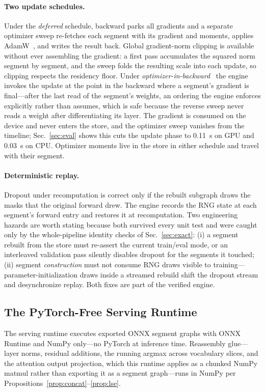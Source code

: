 \documentclass[journal]{IEEEtran}
\begin{document}
\paragraph{Two update schedules.}
Under the \emph{deferred} schedule, backward parks all gradients and a
separate optimizer sweep re-fetches each segment with its gradient and
moments, applies AdamW~\cite{loshchilov2019adamw}, and writes the result back. Global gradient-norm
clipping is available without ever assembling the gradient: a first pass
accumulates the squared norm segment by segment, and the sweep folds the
resulting scale into each update, so clipping respects the residency floor.
Under \emph{optimizer-in-backward}~\cite{lv2024lomo} the engine invokes the
update at the point in the backward where a segment's gradient is
final---after the last read of the segment's weights, an ordering the engine
enforces explicitly rather than assumes, which is safe because the reverse
sweep never reads a weight after differentiating its layer. The gradient is
consumed on the device and never enters the store, and the optimizer sweep
vanishes from the timeline; Sec.~\ref{sec:eval} shows this cuts the
update phase to 0.11~s on GPU and 0.03~s on CPU. Optimizer moments live in the store in
either schedule and travel with their segment.

\paragraph{Deterministic replay.}
Dropout under recomputation is correct only if the rebuilt subgraph draws the
masks that the original forward drew. The engine records the RNG state at
each segment's forward entry and restores it at recomputation. Two
engineering hazards are worth stating because both survived every unit test
and were caught only by the whole-pipeline identity checks of
Sec.~\ref{sec:exact}: (i) a segment rebuilt from the store must re-assert the
current train/eval mode, or an interleaved validation pass silently disables
dropout for the segments it touched; (ii) segment \emph{construction} must
not consume RNG draws visible to training---parameter-initialization draws
inside a streamed rebuild shift the dropout stream and desynchronize replay.
Both fixes are part of the verified engine.

\subsection{The PyTorch-Free Serving Runtime}\label{sec:onnxrt}
The serving runtime executes exported ONNX segment graphs with ONNX Runtime
and NumPy only---no PyTorch at inference time. Reassembly glue---layer norms, residual additions, the running argmax
across vocabulary slices, and the attention output projection, which this
runtime applies as a chunked NumPy matmul rather than exporting it as a
segment graph---runs in NumPy per
Propositions~\ref{prop:concat}--\ref{prop:lse}.
\end{document}
